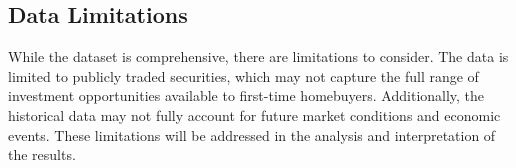 \subsection{Data Limitations}
While the dataset is comprehensive, there are limitations to consider. The data is limited to publicly traded securities, which may not capture the full range of investment opportunities available to first-time homebuyers. Additionally, the historical data may not fully account for future market conditions and economic events. These limitations will be addressed in the analysis and interpretation of the results.
